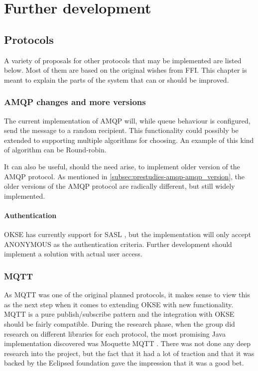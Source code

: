 
\chapter{Further development}

\section{Protocols}
A variety of proposals for other protocols that may be implemented are listed below. Most of them are based on the original wishes from FFI. This chapter is meant to explain the parts of the system that can or should be improved. 

\subsection{AMQP changes and more versions}
The current implementation of AMQP will, while queue behaviour is configured, send the message to a random recipient. This functionality could possibly be extended to supporting multiple algorithms for choosing. An example of this kind of algorithm can be Round-robin.

It can also be useful, should the need arise, to implement older version of the AMQP protocol. As mentioned in \ref{subsec:prestudies-amqp-amqp_version}, the older versions of the AMQP protocol are radically different, but still widely implemented.

\subsubsection{Authentication}
OKSE has currently support for SASL \cite{sasl}, but the implementation will only accept ANONYMOUS as the authentication criteria. Further development should implement a solution with actual user access. 

\subsection{MQTT}
As MQTT was one of the original planned protocols, it makes sense to view this as the next step when it comes to extending OKSE with new functionality. MQTT is a pure publish/subscribe pattern and the integration with OKSE should be fairly compatible. 
During the research phase, when the group did research on different libraries for each protocol, the most promising Java implementation discovered was Moquette MQTT \cite{moquette-mqtt}. There was not done any deep research into the project, but the fact that it had a lot of traction and that it was backed by the Eclipsed foundation gave the impression that it was a good bet.


